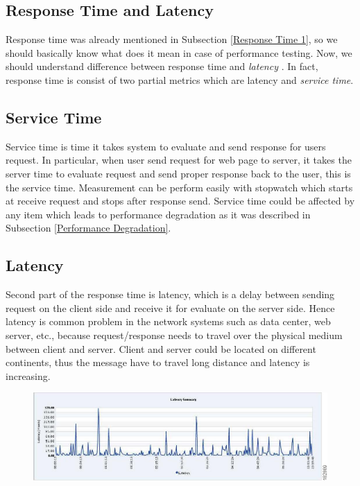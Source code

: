 \subsection{Response Time and Latency}
Response time was already mentioned in Subsection \ref{Response Time 1}, so we should basically know what does it mean in case of performance testing. Now, we should understand difference between response time and \emph{latency} \cite{Broadwell:RPT, BHATT:PERF}. In fact, response time is consist of two partial metrics which are latency and \emph{service time}. 

\subsection*{Service Time}
Service time is time it takes system to evaluate and send response for users request. In particular, when user send request for web page to server, it takes the server time to evaluate request and send proper response back to the user, this is the service time. Measurement can be perform easily with stopwatch which starts at receive request and stops after response send. Service time could be affected by any item which leads to performance degradation as it was described in Subsection \ref{Performance Degradation}. 

\subsection*{Latency}
Second part of the response time is latency, which is a delay between sending request on the client side and receive it for evaluate on the server side. Hence latency is common problem in the network systems such as data center, web server, etc., because request/response needs to travel over the physical medium between client and server. Client and server could be located on different continents, thus the message have to travel long distance and latency is increasing.  

\begin{figure}[H]
  \centering
  \includegraphics[width=15cm]{obrazky-figures/latency.jpg}
  \caption{}
  \label{fig:latency}
\end{figure}

